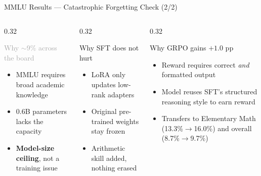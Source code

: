 \documentclass[aspectratio=169,10pt]{beamer}
\begin{document}
\begin{frame}{MMLU Results — Catastrophic Forgetting Check (2/2)}
  \begin{columns}[T]
    \begin{column}{0.32\textwidth}
      \begin{block}{\textcolor{darkgray}{Why $\sim$9\% across the board}}
        \begin{itemize}\small
          \item MMLU requires broad academic knowledge
          \item 0.6B parameters lacks the capacity
          \item \textbf{Model-size ceiling}, not a training issue
        \end{itemize}
      \end{block}
    \end{column}
    \begin{column}{0.32\textwidth}
      \begin{block}{\textcolor{sftoran}{Why SFT does not hurt}}
        \begin{itemize}\small
          \item LoRA only updates low-rank adapters
          \item Original pre-trained weights stay frozen
          \item Arithmetic skill added, nothing erased
        \end{itemize}
      \end{block}
    \end{column}
    \begin{column}{0.32\textwidth}
      \begin{block}{\textcolor{grpogre}{Why GRPO gains $+1.0$ pp}}
        \begin{itemize}\small
          \item Reward requires correct \emph{and} formatted output
          \item Model reuses SFT's structured reasoning style to earn reward
          \item Transfers to Elementary Math (13.3\%$\to$16.0\%) and overall (8.7\%$\to$9.7\%)
        \end{itemize}
      \end{block}
    \end{column}
  \end{columns}
\end{frame}
\end{document}
